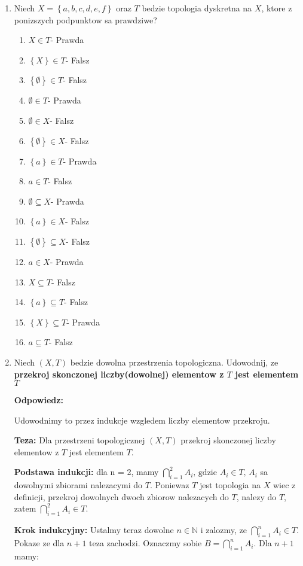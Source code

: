 \documentclass{article}
\begin{document}
\begin{enumerate}
\item Niech $X = \left\{a,b,c,d,e,f\right\}$ oraz $T$ bedzie topologia dyskretna na $X$, ktore z ponizszych podpunktow sa prawdziwe?

\begin{enumerate}[label=(\alph*)]
\item $X \in T$- Prawda
\item $\left\{X\right\} \in T$- Falsz
\item $\left\{ \emptyset\right\} \in T$- Falsz
\item $\emptyset \in T$- Prawda
\item $\emptyset \in X$- Falsz 
\item $\left\{ \emptyset\right\} \in X$- Falsz
\item $\left\{a \right\} \in T$- Prawda
\item $a  \in T$- Falsz
\item $\emptyset \subseteq X$- Prawda
\item $\left\{a \right\} \in X$- Falsz
\item $\left\{\emptyset \right\} \subseteq X$- Falsz
\item $a \in X$- Prawda
\item $X \subseteq T$- Falsz
\item $\left\{a \right\} \subseteq T$- Falsz
\item $\left\{X\right\} \subseteq T$- Prawda
\item $a \subseteq T$- Falsz
\end{enumerate}

\item Niech $(X, T)$ bedzie dowolna przestrzenia topologiczna. Udowodnij, ze \textbf{przekroj skonczonej liczby(dowolnej) elementow z $T$ jest elementem $T$}

\textbf{Odpowiedz:}

Udowodnimy to przez indukcje wzgledem liczby elementow przekroju.

\textbf{Teza:} Dla przestrzeni topologicznej $(X,T)$ przekroj skonczonej liczby elementow z $T$ jest elementem $T$.

\textbf{Podstawa indukcji:} dla n = 2, mamy $\bigcap\limits_{i = 1}^{2}A_{i} \text{, gdzie } A_{i} \in T \text{, } A_{i}$ sa dowolnymi zbiorami nalezacymi do $T$. Poniewaz $T$ jest topologia na $X$ wiec z definicji, przekroj dowolnych dwoch zbiorow nalezacych do $T$, nalezy do $T$, zatem $\bigcap\limits_{i = 1}^{2}A_{i} \in T$.

\textbf{Krok indukcyjny:}
Ustalmy teraz dowolne $n \in  \mathbb{N}$ i zalozmy, ze $\bigcap\limits_{i = 1}^{n}A_{i} \in T$. Pokaze ze dla $n+1$ teza zachodzi.
Oznaczmy sobie $B = \bigcap\limits_{i = 1}^{n}A_{i}$.
Dla $n+1$ mamy:


\end{enumerate}
\end{document}
